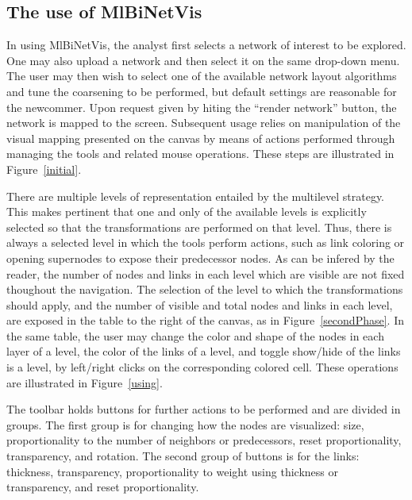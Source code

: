 \documentclass[runningheads]{llncs}
\begin{document}
\subsection{The use of MlBiNetVis}
In using MlBiNetVis,
the analyst first selects a network of interest to be explored.
One may also upload a network and then select it on the same drop-down menu.
The user may then wish to select one of the available network layout
algorithms and tune the coarsening to be performed, but default settings are reasonable
for the newcommer.
Upon request given by hiting the ``render network'' button,
the network is mapped to the screen.
Subsequent usage relies on manipulation of the visual mapping presented on the
canvas by means of actions
performed through managing the tools and related mouse operations.
These steps are illustrated in Figure~\ref{initial}.


There are multiple levels of representation entailed by the multilevel strategy.
This makes pertinent that one and only of the available levels is explicitly selected
so that the transformations are performed on that level.
Thus, there is always a selected level in which the tools perform actions, such
as link coloring or opening supernodes to expose their predecessor nodes.
As can be infered by the reader,
the number of nodes and links in each level which are visible are not fixed thoughout the
navigation.
The selection of the level to which the transformations should apply, and the number
of visible and total nodes and links in each level, are exposed in the table to the right
of the canvas, as in Figure~\ref{secondPhase}.
In the same table, the user may change the color and shape of the nodes in each layer of
a level, the color of the links of a level, and toggle show/hide of the links is a level,
by left/right clicks on the corresponding colored cell.
These operations are illustrated in Figure~\ref{using}.

The toolbar holds buttons for further actions to be performed and are divided in groups.
The first group is for changing how the nodes are visualized: size, proportionality to
the number of neighbors or predecessors, reset proportionality, transparency, and rotation.
The second group of buttons is for the links: thickness, transparency, proportionality to weight
using thickness or transparency, and reset proportionality.
\end{document}
